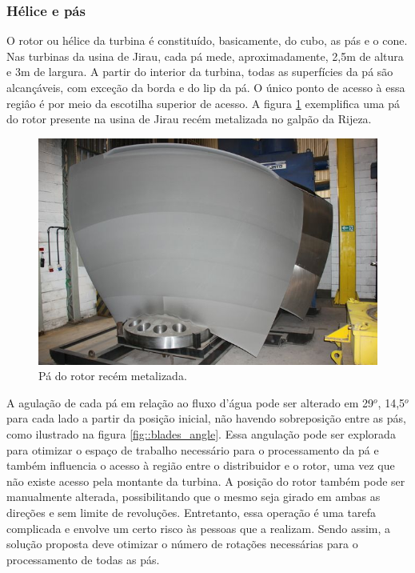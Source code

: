 \subsubsection{Hélice e pás}
 
O rotor ou hélice da turbina é constituído, basicamente, do cubo, as pás e o cone. 
Nas turbinas da usina de Jirau, cada pá mede, aproximadamente, 2,5m de altura e
3m de largura. A partir do interior da turbina, todas as superfícies da pá são
alcançáveis, com exceção da borda e do lip da pá. O único ponto de acesso à
essa regiâo é por meio da escotilha superior de acesso. A figura
\ref{fig::blade_rijeza} exemplifica uma pá do rotor presente na usina de Jirau recém metalizada no galpão da Rijeza.

\begin{figure}[h!]	
	\includegraphics[width=\columnwidth]{figs/viagem/2015_04_28/Rijeza/img_4887}
	\caption{Pá do rotor recém metalizada.}
	\label{fig::blade_rijeza}
\end{figure}

A agulação de cada pá em relação ao fluxo d'água pode ser alterado em 29$^o$, 14,5$^o$ para cada 
lado a partir da posição inicial, não havendo sobreposição entre as pás, como
ilustrado na figura \ref{fig::blades_angle}.
Essa angulação pode ser explorada para otimizar o espaço de trabalho necessário
para o processamento da pá e também influencia o acesso à região
entre o distribuidor e o rotor, uma vez que não existe acesso pela montante da turbina. A posição do 
rotor também pode ser manualmente alterada, possibilitando 
que o mesmo seja girado em ambas as direções e sem limite de revoluções. Entretanto, essa operação 
é uma tarefa complicada e envolve um certo risco às pessoas que a realizam. Sendo assim, a solução 
proposta deve otimizar o número de rotações necessárias para o processamento de todas as pás.

